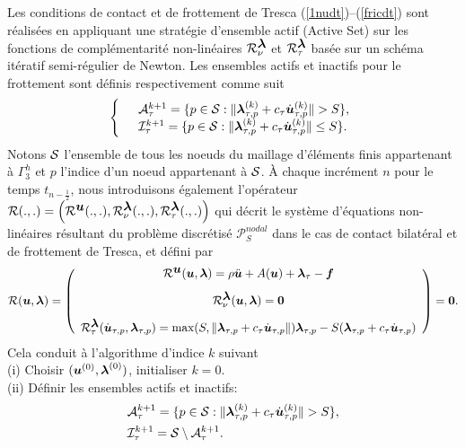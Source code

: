 Les conditions de contact et de frottement de Tresca (\ref{1nudt})--(\ref{fricdt}) sont réalisées en appliquant une stratégie d'ensemble actif (Active Set) sur les fonctions de complémentarité non-linéaires ${\cal R}_{\nu}^{\mbox{\boldmath{$\lambda$}}}$ et ${\cal R}_{\tau}^{\mbox{\boldmath{$\lambda$}}}$ basée sur un schéma itératif semi-régulier de Newton. Les ensembles actifs et inactifs pour le frottement sont définis respectivement comme suit
\begin{align}
\left\{\begin{array}{ll}
&{\cal A}^{k+1}_\tau=\{p\in {\cal S}:\|\blambda_{\tau, p}^{(k)}+c_\tau \dot\bu_{\tau, p}^{(k)}\|> S\},\\
&{\cal I}^{k+1}_\tau=\{p\in {\cal S}:\|\blambda_{\tau, p}^{(k)}+c_\tau \dot\bu_{\tau, p}^{(k)}\|\leq S\}.
\end{array}\right.
\label{ensactifinactif}
\end{align}
Notons ${\cal S}$ l'ensemble de tous les noeuds du maillage d'éléments finis appartenant à $\Gamma_3^h$ et $p$ l'indice d'un noeud appartenant à ${\cal S}$.
À chaque incrément $n$ pour le temps $t_{n-\frac{1}{2}}$, nous introduisons également l'opérateur ${\cal R}(.,.)=\left({\cal R}^{\mbox{\boldmath{$u$}}}(.,.),{\cal R}_{\nu}^{\mbox{\boldmath{$\lambda$}}}(.,.),{\cal R}_{\tau}^{\mbox{\boldmath{$\lambda$}}}(.,.)\right)$ qui décrit le système d'équations non-linéaires résultant du problème discrétisé ${\mathcal P}_S^{nodal}$ dans le cas de contact bilatéral et de frottement de Tresca, et défini par
\begin{equation}
\label{Rsystem2}
{\cal R}(\mbox{\boldmath{$u$}},\mbox{\boldmath{$\lambda$}})=\left(
\begin{array}{c}
{\cal R}^{\mbox{\boldmath{$u$}}}(\mbox{\boldmath{$u$}},\mbox{\boldmath{$\lambda$}})=\rho\ddot{\mbox{\boldmath{$u$}}} + A(\mbox{\boldmath{$u$}}) + \mbox{\boldmath{$\lambda$}}_{\tau}- \mbox{\boldmath{$f$}}\\[3mm]
  {\cal R}_{\nu}^{\mbox{\boldmath{$\lambda$}}}(\mbox{\boldmath{$u$}},\mbox{\boldmath{$\lambda$}}) = \mbox{\boldmath{$0$}} \\[3mm]
{\cal R}_{\tau}^{\mbox{\boldmath{$\lambda$}}}(\dot{\mbox{\boldmath{$u$}}}_{\tau, p},\mbox{\boldmath{$\lambda$}}_{\tau, p})=\max ( S, \|\mbox{\boldmath{$\lambda$}}_{\tau, p}+c_\tau \dot{\mbox{\boldmath{$u$}}}_{\tau, p}\|)\mbox{\boldmath{$\lambda$}}_{\tau, p}- S (\mbox{\boldmath{$\lambda$}}_{\tau, p}+c_\tau \dot{\mbox{\boldmath{$u$}}}_{\tau, p})
\end{array}\right) = \mbox{\boldmath{$0$}}.
\end{equation}
Cela conduit à l'algorithme d'indice $k$ suivant \\
\noindent
\qquad(i) Choisir $(\mbox{\boldmath{$u$}}^{(0)},\mbox{\boldmath{$\lambda$}}^{(0)})$, initialiser $k=0$.\\[1mm]
\qquad(ii) Définir les ensembles actifs et inactifs:
\begin{align*}
&{\cal A}^{k+1}_\tau=\{p\in {\cal S}:\|\blambda_{\tau, p}^{(k)}+c_\tau \dot\bu_{\tau, p}^{(k)}\|> S\},\\
&{\cal I}^{k+1}_\tau={\cal S}\setminus {\cal A}^{k+1}_\tau.
\end{align*}
